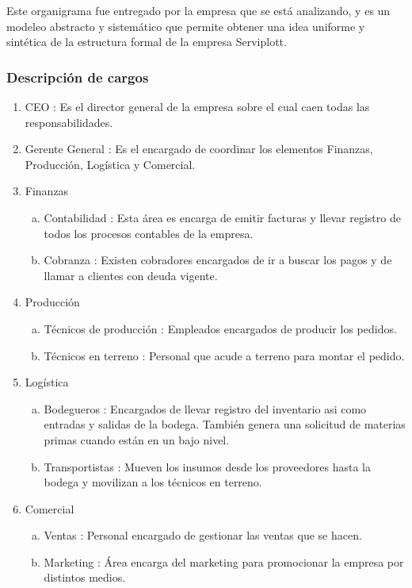 	
	Este organigrama fue entregado por la empresa que se está analizando, y es un modeleo abstracto y sistemático que permite obtener una idea uniforme y sintética de la estructura formal de la empresa Serviplott.
		\subsubsection{Descripción de cargos}
    \begin{enumerate}
    \item CEO :	Es el director general de la empresa sobre el cual caen todas las responsabilidades.
    \item Gerente General : Es el encargado de coordinar los elementos Finanzas, Producción, Logística y Comercial.
    \item Finanzas
    \begin{enumerate}[a)]
        \item Contabilidad : Esta área es encarga de emitir facturas y llevar registro de todos los procesos contables de la empresa.
        \item Cobranza : Existen cobradores encargados de ir a buscar los pagos y de llamar a clientes con deuda vigente.
    \end{enumerate}
    \item Producción
    \begin{enumerate}[a)]
        \item Técnicos de producción : Empleados encargados de producir los pedidos.
        \item Técnicos en terreno : Personal que acude a terreno para montar el pedido.
    \end{enumerate}
    \item Logística
    \begin{enumerate}[a)]
        \item Bodegueros : Encargados de llevar registro del inventario asi como entradas y salidas de la bodega. También genera una solicitud de materias primas cuando están en un bajo nivel.
        \item Transportistas : Mueven los insumos desde los proveedores hasta la bodega y movilizan a los técnicos en terreno.
    \end{enumerate}
    \item Comercial
    \begin{enumerate}[a)]
        \item Ventas : Personal encargado de gestionar las ventas que se hacen.
        \item Marketing : Área encarga del marketing para promocionar la empresa por distintos medios.\newpage
    \end{enumerate}
    \end{enumerate}
